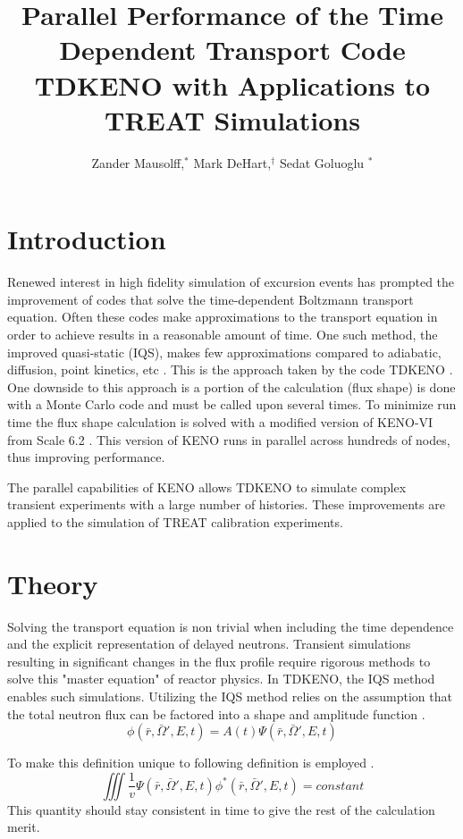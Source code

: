 \documentclass{anstrans}
\title{Parallel Performance of the Time Dependent Transport Code TDKENO with Applications to TREAT Simulations}
\author{Zander Mausolff,$^{*}$ Mark DeHart,$^{\dagger}$ Sedat Goluoglu $^{*}$}
\institute{
$^{*}$Nuclear Engineering Program, University of Florida
\\
529 Gale Lemerand Dr., Gainesville, FL, 32611
\and
$^{\dagger}$Nuclear Systems Design and Analysis Department Idaho National Laboratory 
\\
2525 North Freemont Street, Idaho Falls ID, 83415
}
\begin{document}
\section{Introduction}
Renewed interest in high fidelity simulation of excursion events has prompted the improvement of codes that solve the time-dependent Boltzmann transport equation. Often these codes make approximations to the transport equation in order to achieve results in a reasonable amount of time.  One such method, the improved quasi-static (IQS), makes few approximations compared to adiabatic, diffusion, point kinetics, etc \cite{Henry}. This is the approach taken by the code TDKENO \cite{Bentley}.  One downside to this approach is a portion of the calculation (flux shape) is done with a Monte Carlo code and must be called upon several times.  To minimize run time the flux shape calculation is solved with a modified version of KENO-VI from Scale 6.2  \cite{rearden2013overview}. This version of KENO runs in parallel across hundreds of nodes, thus improving performance.

The parallel capabilities of KENO allows TDKENO to simulate complex transient experiments with a large number of histories. These improvements are applied to the simulation of TREAT calibration experiments. 

\section{Theory}
Solving the transport equation is non trivial when including the time dependence and the explicit representation of delayed neutrons. Transient simulations resulting in significant changes in the flux profile require rigorous methods to solve this "master equation" of reactor physics.  In TDKENO, the IQS method enables such simulations.  Utilizing the IQS method relies on the assumption that the total neutron flux can be factored into a shape and amplitude function \cite{goluoglu2001time}\cite{Gehin}.  
\begin{equation}
\label{factor}
    \phi(\bar{r},\bar{\Omega}',E,t) = A(t)\Psi(\bar{r},\bar{\Omega}',E,t)
\end{equation}

To make this definition unique to following definition is employed \cite{Henry}.  
\begin{equation}
    \label{unique}
    \iiint \frac{1}{v} \Psi(\bar{r},\bar{\Omega}',E,t)\phi^*(\bar{r},\bar{\Omega}',E,t) = constant
\end{equation}
This quantity should stay consistent in time to give the rest of the calculation merit.
\end{document}
